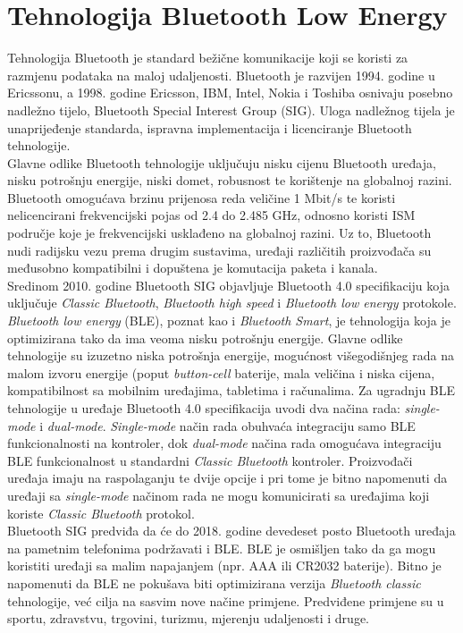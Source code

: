 \chapter{Tehnologija Bluetooth Low Energy}
Tehnologija Bluetooth je standard bežične komunikacije koji se koristi za razmjenu podataka na maloj udaljenosti. Bluetooth je razvijen 1994. godine u Ericssonu, a 1998. godine Ericsson, IBM, Intel, Nokia i Toshiba osnivaju posebno nadležno tijelo, Bluetooth Special Interest Group (SIG). Uloga nadležnog tijela je unaprijeđenje standarda, ispravna implementacija i licenciranje Bluetooth tehnologije.
\\

Glavne odlike Bluetooth tehnologije uključuju nisku cijenu Bluetooth uređaja, nisku potrošnju energije, niski domet, robusnost te korištenje na globalnoj razini.
Bluetooth omogućava brzinu prijenosa reda veličine 1 Mbit/s te koristi nelicencirani frekvencijski pojas od 2.4 do 2.485 GHz, odnosno koristi ISM područje  koje je frekvencijski usklađeno na globalnoj razini. 
Uz to, Bluetooth nudi radijsku vezu prema drugim sustavima, uređaji različitih proizvođača su međusobno kompatibilni i dopuštena je komutacija paketa i kanala.
\\

Sredinom 2010. godine Bluetooth SIG objavljuje Bluetooth 4.0 specifikaciju koja uključuje \textit{Classic Bluetooth}, \textit{Bluetooth high speed} i \textit{Bluetooth low energy} protokole.
\\
\textit{Bluetooth low energy} (BLE), poznat kao i \textit{Bluetooth Smart}, je tehnologija koja je optimizirana tako da ima veoma nisku potrošnju energije. 
Glavne odlike tehnologije su izuzetno niska potrošnja energije, mogućnost višegodišnjeg rada na malom izvoru energije (poput \textit{button-cell} baterije, mala veličina i niska cijena, kompatibilnost sa mobilnim uređajima, tabletima i računalima.
Za ugradnju BLE tehnologije u uređaje Bluetooth 4.0 specifikacija uvodi dva načina rada: \textit{single-mode} i \textit{dual-mode}. 
\textit{Single-mode} način rada obuhvaća integraciju samo BLE funkcionalnosti na kontroler, dok \textit{dual-mode} načina rada omogućava integraciju BLE funkcionalnost u standardni \textit{Classic Bluetooth} kontroler. 
Proizvođači uređaja imaju na raspolaganju te dvije opcije i pri tome je bitno napomenuti da uređaji sa \textit{single-mode} načinom rada ne mogu komunicirati sa uređajima koji koriste \textit{Classic Bluetooth} protokol.
\\

Bluetooth SIG predviđa da će do 2018. godine devedeset posto Bluetooth uređaja na pametnim telefonima podržavati i BLE. BLE je osmišljen tako da ga mogu koristiti uređaji sa malim napajanjem (npr. AAA ili CR2032 baterije). 
Bitno je napomenuti da BLE ne pokušava biti optimizirana verzija \textit{Bluetooth classic} tehnologije, već cilja na sasvim nove načine primjene.  
Predviđene primjene su u sportu, zdravstvu, trgovini, turizmu, mjerenju udaljenosti i druge.  

